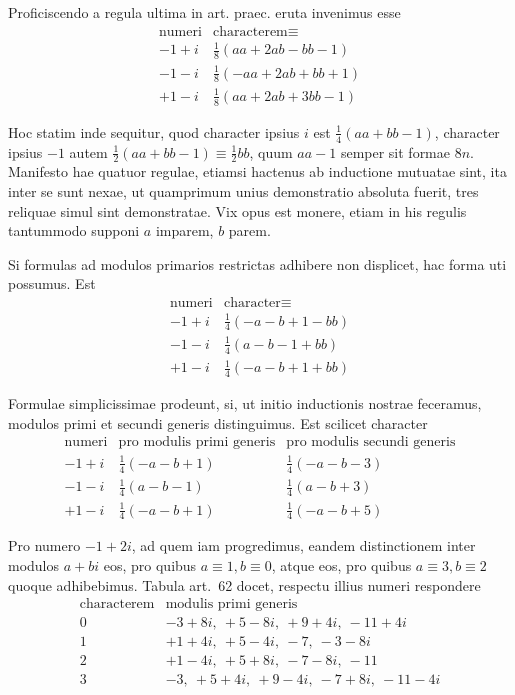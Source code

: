 %
Proficiscendo a regula ultima in art. praec. eruta invenimus esse
\[
\begin{array}{c|l}
\text{numeri}&\text{characterem}\equiv\\\hline
-1+i&\frac18(aa+2ab-bb-1)\\
-1-i&\frac18(-aa+2ab+bb+1)\\
+1-i&\frac18(aa+2ab+3bb-1)
\end{array}
\]

Hoc statim inde sequitur, quod character ipsius $i$ est $\frac14(aa+bb-1)$, character ipsius $-1$ autem $\frac12(aa+bb-1)\equiv\frac12bb$, quum $aa-1$ semper sit formae $8n$. Manifesto hae quatuor regulae, etiamsi hactenus ab inductione mutuatae sint, ita inter se sunt nexae, ut quamprimum unius demonstratio absoluta fuerit, tres reliquae simul sint demonstratae. Vix opus est monere, etiam in his regulis tantummodo supponi $a$ imparem, $b$ parem.

Si formulas ad modulos primarios restrictas adhibere non displicet, hac forma uti possumus. Est
\[
\begin{array}{c|l}
\text{numeri}&\text{character}\equiv\\\hline
-1+i&\frac14(-a-b+1-bb)\\
-1-i&\frac14(a-b-1+bb)\\
+1-i&\frac14(-a-b+1+bb)
\end{array}
\]

Formulae simplicissimae prodeunt, si, ut initio inductionis nostrae feceramus, modulos primi et secundi generis distinguimus. Est scilicet character
\[
\begin{array}{c|c|c}
\text{numeri}&\text{pro modulis primi generis}&\text{pro modulis secundi generis}\\\hline
-1+i&\frac14(-a-b+1)&\frac14(-a-b-3)\\
-1-i&\frac14(a-b-1)&\frac14(a-b+3)\\
+1-i&\frac14(-a-b+1)&\frac14(-a-b+5)
\end{array}
\]

Pro numero $-1+2i$, ad quem iam progredimus, eandem distinctionem inter modulos $a+bi$ eos, pro quibus $a\equiv1,b\equiv0$, atque eos, pro quibus $a\equiv3,b\equiv2$ quoque adhibebimus. Tabula art.~62 docet, respectu illius numeri respondere
%
\[
\begin{array}{c|l}
\text{characterem}&\text{modulis primi generis}\\\hline
0&-3+8i,\ +5-8i,\ +9+4i,\ -11+4i\\
1&+1+4i,\ +5-4i,\ -7,\ -3-8i\\
2&+1-4i,\ +5+8i,\ -7-8i,\ -11\\
3&-3,\ +5+4i,\ +9-4i,\ -7+8i,\ -11-4i
\end{array}
\]

